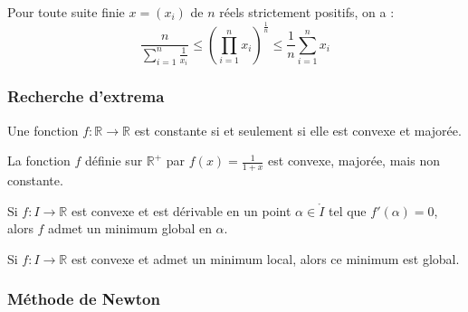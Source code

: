   \begin{proposition}
    Pour toute suite finie $x = (x_i)$ de $n$ réels strictement positifs, on a :
    \[ \frac{n}{\sum_{i=1}^n \frac{1}{x_i}} \leq \left( \prod_{i=1}^n x_i \right)^{\frac{1}{n}} \leq \frac{1}{n} \sum_{i=1}^n x_i \]
  \end{proposition}

  \subsubsection{Recherche d'extrema}


  \begin{proposition}
    Une fonction $f : \mathbb{R} \rightarrow \mathbb{R}$ est constante si et seulement si elle est convexe et majorée.
  \end{proposition}

  \begin{cexample}
    La fonction $f$ définie sur $\mathbb{R}^+$ par $f(x) = \frac{1}{1+x}$ est convexe, majorée, mais non constante.
  \end{cexample}

  \begin{proposition}
    Si $f : I \rightarrow \mathbb{R}$ est convexe et est dérivable en un point $\alpha \in \mathring{I}$ tel que $f'(\alpha) = 0$, alors $f$ admet un minimum global en $\alpha$.
  \end{proposition}

  \begin{proposition}
    Si $f : I \rightarrow \mathbb{R}$ est convexe et admet un minimum local, alors ce minimum est global.
  \end{proposition}

  \subsubsection{Méthode de Newton}



